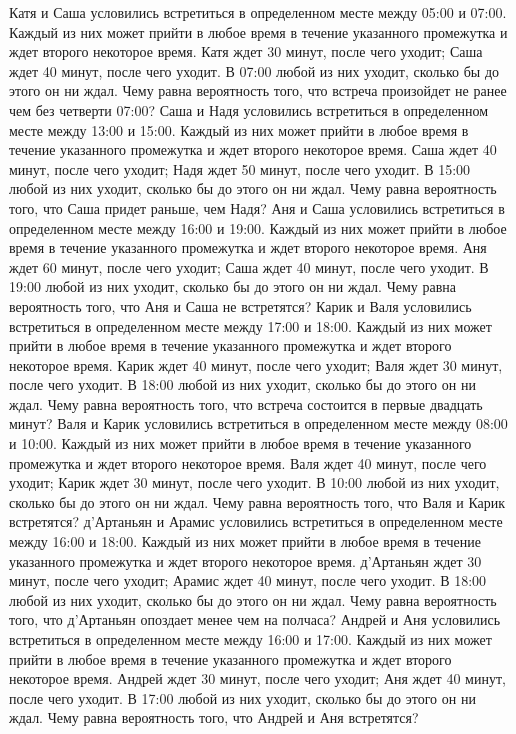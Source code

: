 Катя и Саша условились встретиться в определенном месте между 05:00 и 07:00. Каждый из них может прийти в любое время в течение указанного промежутка и ждет второго некоторое время. Катя ждет 30 минут, после чего уходит; Саша ждет 40 минут, после чего уходит. В 07:00 любой из них уходит, сколько бы до этого он ни ждал. Чему равна вероятность того, что встреча произойдет не ранее чем без четверти 07:00?
Саша и Надя условились встретиться в определенном месте между 13:00 и 15:00. Каждый из них может прийти в любое время в течение указанного промежутка и ждет второго некоторое время. Саша ждет 40 минут, после чего уходит; Надя ждет 50 минут, после чего уходит. В 15:00 любой из них уходит, сколько бы до этого он ни ждал. Чему равна вероятность того, что Саша придет раньше, чем Надя?
Аня и Саша условились встретиться в определенном месте между 16:00 и 19:00. Каждый из них может прийти в любое время в течение указанного промежутка и ждет второго некоторое время. Аня ждет 60 минут, после чего уходит; Саша ждет 40 минут, после чего уходит. В 19:00 любой из них уходит, сколько бы до этого он ни ждал. Чему равна вероятность того, что Аня и Саша не встретятся?
Карик и Валя условились встретиться в определенном месте между 17:00 и 18:00. Каждый из них может прийти в любое время в течение указанного промежутка и ждет второго некоторое время. Карик ждет 40 минут, после чего уходит; Валя ждет 30 минут, после чего уходит. В 18:00 любой из них уходит, сколько бы до этого он ни ждал. Чему равна вероятность того, что встреча состоится в первые двадцать минут?
Валя и Карик условились встретиться в определенном месте между 08:00 и 10:00. Каждый из них может прийти в любое время в течение указанного промежутка и ждет второго некоторое время. Валя ждет 40 минут, после чего уходит; Карик ждет 30 минут, после чего уходит. В 10:00 любой из них уходит, сколько бы до этого он ни ждал. Чему равна вероятность того, что Валя и Карик встретятся?
д'Артаньян и Арамис условились встретиться в определенном месте между 16:00 и 18:00. Каждый из них может прийти в любое время в течение указанного промежутка и ждет второго некоторое время. д'Артаньян ждет 30 минут, после чего уходит; Арамис ждет 40 минут, после чего уходит. В 18:00 любой из них уходит, сколько бы до этого он ни ждал. Чему равна вероятность того, что д'Артаньян опоздает менее чем на полчаса?
Андрей и Аня условились встретиться в определенном месте между 16:00 и 17:00. Каждый из них может прийти в любое время в течение указанного промежутка и ждет второго некоторое время. Андрей ждет 30 минут, после чего уходит; Аня ждет 40 минут, после чего уходит. В 17:00 любой из них уходит, сколько бы до этого он ни ждал. Чему равна вероятность того, что Андрей и Аня встретятся?
